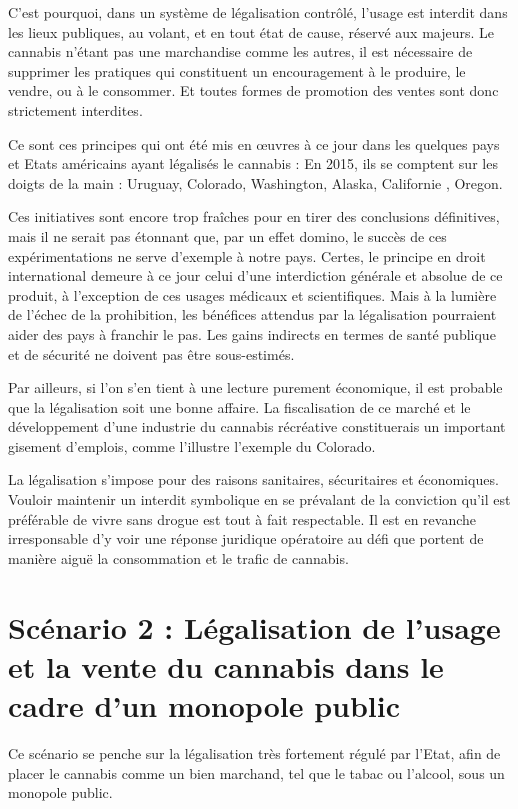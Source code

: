 C’est pourquoi, dans un système de légalisation contrôlé, l’usage est interdit dans les lieux publiques, au volant, et en tout état de cause, réservé aux majeurs. Le cannabis n’étant pas une marchandise comme les autres, il est nécessaire de supprimer les pratiques qui constituent un encouragement à le produire, le vendre, ou à le consommer. Et toutes formes de promotion des ventes sont donc strictement interdites.

Ce sont ces principes qui ont été mis en œuvres à ce jour dans les quelques pays et Etats américains ayant légalisés le cannabis : En 2015, ils se comptent sur les doigts de la main : Uruguay, Colorado, Washington, Alaska, Californie , Oregon.

Ces initiatives sont encore trop fraîches pour en tirer des conclusions définitives, mais il ne serait pas étonnant que, par un effet domino, le succès de ces expérimentations ne serve d’exemple à notre pays. Certes, le principe en droit international demeure à ce jour celui d’une interdiction générale et absolue de ce produit, à l’exception de ces usages médicaux et scientifiques. Mais à la lumière de l’échec de la prohibition, les bénéfices attendus par la légalisation pourraient aider des pays à franchir le pas. Les gains indirects en termes de santé publique et de sécurité ne doivent pas être sous-estimés.

Par ailleurs, si l’on s’en tient à une lecture purement économique, il est probable que la légalisation soit une bonne affaire. La fiscalisation de ce marché et le développement d’une industrie du cannabis récréative constituerais un important gisement d’emplois, comme l’illustre l’exemple du Colorado.

La légalisation s’impose pour des raisons sanitaires, sécuritaires et économiques. Vouloir maintenir un interdit symbolique en se prévalant de la conviction qu’il est préférable de vivre sans drogue est tout à fait respectable. Il est en revanche irresponsable d’y voir une réponse juridique opératoire au défi que portent de manière aiguë la consommation et le trafic de cannabis.
 
\section{Scénario 2 : Légalisation de l’usage et la vente du cannabis dans le cadre d’un monopole public}
 
Ce scénario se penche sur la légalisation très fortement régulé par l’Etat, afin de placer le cannabis comme un bien marchand, tel que le tabac ou l’alcool, sous un monopole public.

